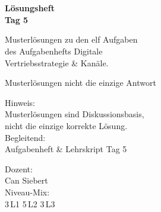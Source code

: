 \documentclass[11pt,a4paper,oneside]{article}
\begin{document}
\begin{titlepage}
  \pagestyle{empty}
  \vspace*{1.5cm}
  \\[2pt]
  \noindent{\color{lpAccent}\rule{\linewidth}{1.2pt}}\\[4pt]

  \vspace{3cm}
  {\sffamily\fontsize{30}{34}\selectfont\bfseries\color{lpInk}Lösungsheft\\Tag 5\par}

  \vspace{0.7cm}
  {\sffamily\large\color{lpGray}Musterlösungen zu den elf Aufgaben\\des Aufgabenhefts \textendash{} Digitale\\Vertriebsstrategie \& Kanäle.\par}

  \vspace{1.5cm}
  {\caveatfont\LARGE\color{lpGreen}Musterlösungen \textperiodcentered{} nicht die einzige Antwort}\par

  \vfill

  \noindent\begin{minipage}{0.55\linewidth}
    {\sffamily\footnotesize\color{lpGray}Hinweis:}\\
    {\sffamily\small\color{lpInk}Musterlösungen sind Diskussionsbasis,\\nicht die einzige korrekte Lösung.}\\[10pt]
    {\sffamily\footnotesize\color{lpGray}Begleitend:}\\
    {\sffamily\small\color{lpInk}Aufgabenheft \& Lehrskript Tag 5}
  \end{minipage}\hfill
  \begin{minipage}{0.4\linewidth}
    \raggedleft
    {\sffamily\footnotesize\color{lpGray}Dozent:}\\
    {\sffamily\small\color{lpInk}Can Siebert}\\[10pt]
    {\sffamily\footnotesize\color{lpGray}Niveau-Mix:}\\
    {\sffamily\small\color{lpInk}3\,L1 \textperiodcentered{} 5\,L2 \textperiodcentered{} 3\,L3}
  \end{minipage}

  \vspace{0.5cm}
  \noindent{\color{lpAccent}\rule{\linewidth}{0.6pt}}
\end{titlepage}
\end{document}

